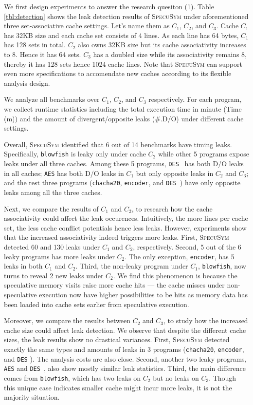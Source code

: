\documentclass[sigconf, review]{acmart}
\newcommand{\SpecuSym}{\textsc{SpecuSym} }
\begin{document}
We first design experiments to answer the research quesiton (1). Table
\ref{tbl:detection} shows the leak detection results of \SpecuSym under 
aforementioned three set-associative cache settings. Let's name them as 
{$C_1$}, $C_2$, and $C_3$. Cache $C_1$ has 32KB size and each cache set 
consists of 4 lines. As each line has 64 bytes, $C_1$ has 128 sets in 
total. $C_2$ also owns 32KB size but its cache associativity increases 
to 8. Hence it has 64 sets. $C_3$ has a doubled size while its 
associativity remains 8, thereby it has 128 sets hence 1024 cache lines. 
Note that \SpecuSym can support even more specifications to accomendate 
new caches according to its flexible analysis design. 


We analyze all benchmarks over $C_1$, $C_2$, and $C_3$ respectively. For 
each program, we collect runtime statistics including the total execution 
time in minute (Time (m)) and the amount of divergent/opposite leaks 
(\#.D/O) under different cache settings. 


Overall, \SpecuSym identified that 6 out of 14 benchmarks have timing 
leaks. Specifically, \texttt{blowfish} is leaky only under cache $C_2$ 
while other 5 programs expose leaks under all three caches. Among these 
5 programs, \texttt{DES}~\cite{glibc} has both D/O leaks in all caches; 
\texttt{AES} has both D/O leaks in $C_1$ but only opposite leaks in $C_2$ 
and $C_3$; and the rest three programs (\texttt{chacha20}, \texttt{encoder}, 
and \texttt{DES}~\cite{OpenSSL111c}) have only opposite leaks among all 
the three caches.


Next, we compare the results of $C_1$ and $C_2$, to research how the cache 
associativity could affect the leak occurences. Intuitively, the more lines 
per cache set, the less cache conflict potentials hence less leaks. However, 
experiments show that the increased associativity indeed triggers more leaks. 
First, \SpecuSym detected 60 and 130 leaks under $C_1$ and $C_2$, respectively. 
Second, 5 out of the 6 leaky programs has more leaks under $C_2$. The only 
exception, \texttt{encoder}, has 5 leaks in both $C_1$ and $C_2$. Third, the 
non-leaky program under $C_1$, \texttt{blowfish}, now turns to reveal 2 new 
leaks under $C_2$. We find this phenomenon is because the speculative memory 
visits raise more cache hits --- the cache misses under non-speculative 
execution now have higher possibilities to be hits as memory data has been 
loaded into cache sets earlier from speculative execution. 


Moreover, we compare the results between $C_2$ and $C_3$, to study how the 
increased cache size could affect leak detection. We observe that despite
the different cache sizes, the leak results show no drastical variances. 
First, \SpecuSym detected exactly the same types and amounts of leaks in 
3 programs (\texttt{chacha20}, \texttt{encoder}, and \texttt{DES}
\cite{OpenSSL111c}). The analysis costs are also close. Second, another 
two leaky programs, \texttt{AES} and \texttt{DES}~\cite{glibc}, also show 
mostly similar leak statistics. Third, the main difference comes from
\texttt{blowfish}, which has two leaks on $C_2$ but no leaks on $C_3$. 
Though this unique case indicates smaller cache might incur more leaks, it
is not the majority situation. 
\end{document}
